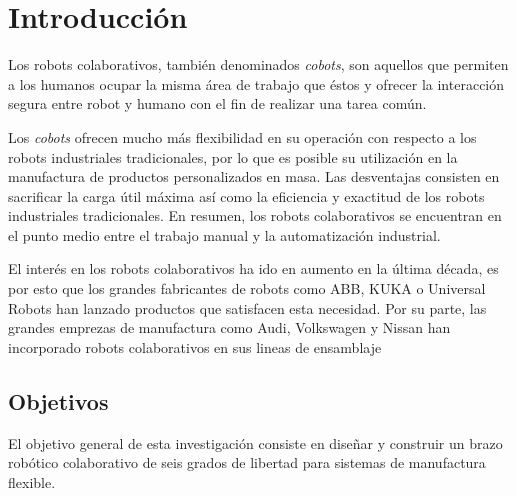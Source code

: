 \chapter{Introducción}

Los robots colaborativos, también denominados \textit{cobots}, son aquellos que permiten a los humanos ocupar la misma área de trabajo que éstos y ofrecer la interacción segura entre robot y humano con el fin de realizar una tarea común. 

Los \textit{cobots} ofrecen mucho más flexibilidad en su operación con respecto a los robots industriales tradicionales, por lo que es posible su utilización en la manufactura de productos personalizados en masa. Las desventajas consisten en sacrificar la carga útil máxima así como la  eficiencia y exactitud de los robots industriales tradicionales. En resumen, los robots colaborativos se encuentran en el punto medio entre el trabajo manual y la automatización industrial. \cite{Zaatari2019}

El interés en los robots colaborativos ha ido en aumento en la última década, es por esto que los grandes fabricantes de robots como ABB, KUKA o Universal Robots han lanzado productos que satisfacen esta necesidad. Por su parte, las grandes emprezas de manufactura como Audi, Volkswagen y Nissan han incorporado robots colaborativos en sus lineas de ensamblaje \cite{Zaatari2019}



\begin{comment}
La finalidad de esta debe ser suministrar suficientes ante-
cedentes para que el lector pueda comprender y evaluar los resultados del

estudio sin necesidad de consultar publicaciones anteriores sobre el tema.
Debe presentar también el fundamento racional del estudio. Por encima de
todo, hay que manifestar breve y claramente cuál es el propósito al escribir
el artículo. Hay que elegir las referencias cuidadosamente para suministrar

\end{comment}


\section{Objetivos}

El objetivo general de esta investigación consiste en diseñar y construir un brazo robótico colaborativo de seis grados de libertad para sistemas de manufactura flexible.

